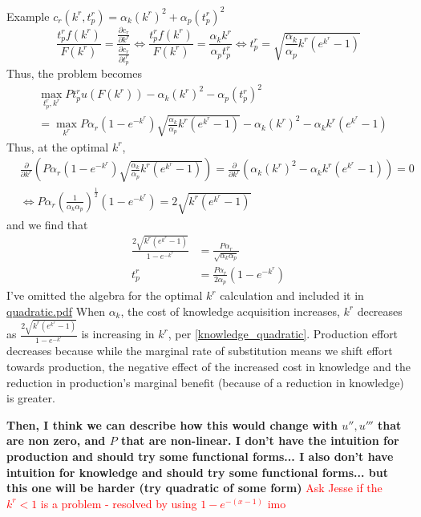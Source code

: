 \documentclass[source/paper/main.tex]{subfiles}
\begin{document}
Example $c_r(k^r, t_p^r) = \alpha_k (k^r)^2 + \alpha_p (t_p^r)^2$\\
$$\frac{t_p^r f(k^r) }{F(k^r)} = \frac{\frac{\partial c_r}{\partial k^r}}{\frac{\partial c_r}{\partial t_p^r}} \iff \frac{t_p^r f(k^r) }{F(k^r)} = \frac{\alpha_k k^r}{\alpha_p t_p^r} \iff t_p^r = \sqrt{\frac{\alpha_k}{\alpha_p} k^r (e^{k^r} - 1)} $$
Thus, the problem becomes
\begin{align*}
    &\max_{t_p^r, k^r} P  t_p^r  u(F(k^r)) - \alpha_k (k^r)^2 - \alpha_p (t_p^r)^2 \\
    &= \max_{k^r} P\alpha_r(1-e^{-k^r}) \sqrt{\frac{\alpha_k}{\alpha_p} k^r (e^{k^r} - 1)}  -\alpha_k (k^r)^2 - \alpha_k k^r (e^{k^r} - 1)
\end{align*}
Thus, at the optimal $k^r$, 
\begin{align*}
    &\frac{\partial }{\partial k^r} \left(P\alpha_r(1-e^{-k^r}) \sqrt{\frac{\alpha_k}{\alpha_p} k^r (e^{k^r} - 1)}\right) = \frac{\partial }{\partial k^r} \left( \alpha_k (k^r)^2 - \alpha_k k^r (e^{k^r} - 1) \right) = 0 \\
    &\iff P \alpha_r \left(\frac{1}{\alpha_k \alpha_p}\right)^{\frac12 } (1 - e^{-k^r}) = 2 \sqrt{k^r (e^{k^r} - 1)}
\end{align*}
and we find that
\begin{align}
    \frac{2\sqrt{k^r(e^{k^r} - 1)}}{1-e^{-k^r}} &= \frac{P\alpha_r}{\sqrt{\alpha_k \alpha_p}} \label{knowledge_quadratic} \\
    t_p^r &= \frac{P\alpha_r}{2\alpha_p} (1-e^{-k^r}) \label{production_effort_quadratic}
\end{align}
I've omitted the algebra for the optimal $k^r$ calculation and included it in 
\href{run:source/paper/math/quadratic.pdf}{quadratic.pdf}
When $\alpha_k$, the cost of knowledge acquisition increases, $k^r$ decreases as $\frac{2\sqrt{k^r(e^{k^r} - 1)}}{1-e^{-k^r}}$ is increasing in $k^r$, per \ref{knowledge_quadratic}. Production effort decreases because while the marginal rate of substitution means we shift effort towards production, the negative effect of the increased cost in knowledge and the reduction in production's marginal benefit (because of a reduction in knowledge) is greater.  


\textbf{Then, I think we can describe how this would change with $u'', u'''$ that are non zero, and $P$ that are non-linear. I don't have the intuition for production and should try some functional forms... I also don't have intuition for knowledge and should try some functional forms... but this one will be harder (try quadratic of some form)}
\textcolor{red}{Ask Jesse if the $k^r<1$ is a problem - resolved by using $1-e^{-(x-1)}$ imo}
\end{document}
